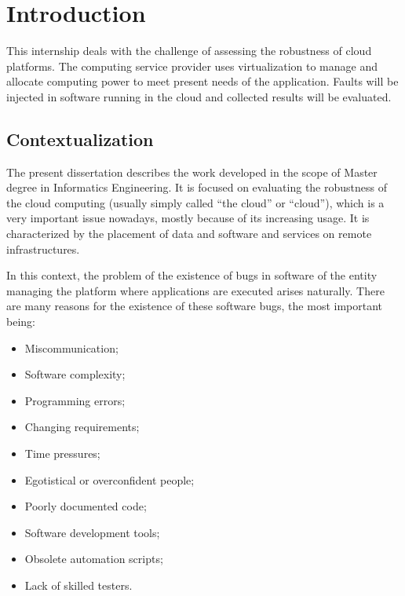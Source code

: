 \clearpage
\section{Introduction}

This internship deals with the challenge of assessing the robustness of cloud platforms. The computing service provider uses virtualization to manage and allocate computing power to meet present needs of the application.
Faults will be injected in software running in the cloud and collected results will be evaluated.

\subsection{Contextualization}


The present dissertation describes the work developed in the scope of Master degree in Informatics Engineering. It is focused on evaluating the robustness of the cloud computing (usually simply called ``the cloud'' or ``cloud''), which is a very important issue nowadays, mostly because of its increasing usage.
It is characterized by the placement of data and software and services on remote infrastructures. 

In this context, the problem of the existence of bugs in software of the entity managing the platform where applications are  executed arises naturally. There are many reasons for the existence of these software bugs, the most important being:

\begin{itemize}
	\item Miscommunication;
	\item Software complexity;
	\item Programming errors;
	\item Changing requirements;
	\item Time pressures;
	\item Egotistical or overconfident people;
	\item Poorly documented code;
	\item Software development tools;
	\item Obsolete automation scripts;
	\item Lack of skilled testers.
\end{itemize}

